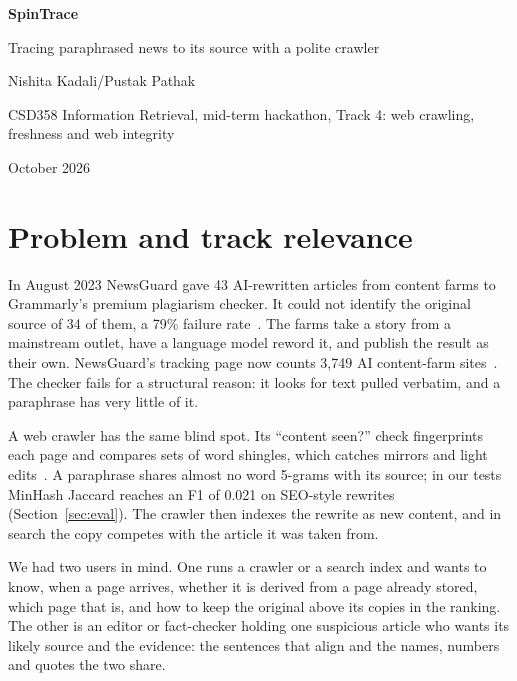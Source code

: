\documentclass[11pt,a4paper]{article}
\begin{document}
{\headfont\bfseries\LARGE SpinTrace\par}
\vspace{0.25em}
{\headfont\large Tracing paraphrased news to its source with a polite crawler\par}
\vspace{0.7em}
{\headfontreg\small Nishita Kadali\quad\textcolor{warmgrey}{/}\quad Pustak Pathak\par
CSD358 Information Retrieval, mid-term hackathon, Track 4: web crawling, freshness and web integrity\par
October 2026\par}
\vspace{0.4em}

\section{Problem and track relevance}

In August 2023 NewsGuard gave 43 AI-rewritten articles from content farms to Grammarly's premium plagiarism checker. It could not identify the original source of 34 of them, a 79\% failure rate~\cite{ng2023}. The farms take a story from a mainstream outlet, have a language model reword it, and publish the result as their own. NewsGuard's tracking page now counts 3,749 AI content-farm sites~\cite{ng2026}. The checker fails for a structural reason: it looks for text pulled verbatim, and a paraphrase has very little of it.

A web crawler has the same blind spot. Its ``content seen?'' check fingerprints each page and compares sets of word shingles, which catches mirrors and light edits~\cite{broder1997,manku2007,iir2008}. A paraphrase shares almost no word 5-grams with its source; in our tests MinHash Jaccard reaches an F1 of 0.021 on SEO-style rewrites (Section~\ref{sec:eval}). The crawler then indexes the rewrite as new content, and in search the copy competes with the article it was taken from.

We had two users in mind. One runs a crawler or a search index and wants to know, when a page arrives, whether it is derived from a page already stored, which page that is, and how to keep the original above its copies in the ranking. The other is an editor or fact-checker holding one suspicious article who wants its likely source and the evidence: the sentences that align and the names, numbers and quotes the two share.
\end{document}
